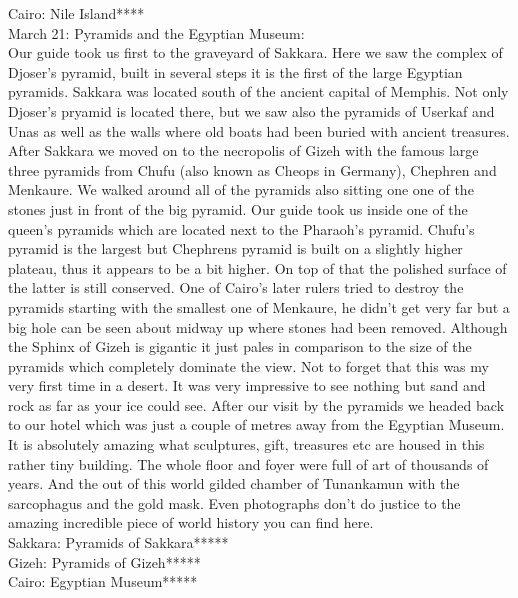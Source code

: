 Cairo: Nile Island****\\

March 21: Pyramids and the Egyptian Museum:\\
Our guide took us first to the graveyard of Sakkara. Here we saw the complex of Djoser's pyramid, built in several steps it is the first of the large Egyptian pyramids. Sakkara was located south of the ancient capital of Memphis. Not only Djoser's pryamid is located there, but we saw also the pyramids of Userkaf and Unas as well as the walls where old boats had been buried with ancient treasures. After Sakkara we moved on to the necropolis of Gizeh with the famous large three pyramids from Chufu (also known as Cheops in Germany), Chephren and Menkaure. We walked around all of the pyramids also sitting one one of the stones just in front of the big pyramid. Our guide took us inside one of the queen's pyramids which are located next to the Pharaoh's pyramid. Chufu's pyramid is the largest but Chephrens pyramid is built on a slightly higher plateau, thus it appears to be a bit higher. On top of that the polished surface of the latter is still conserved. One of Cairo's later rulers tried to destroy the pyramids starting with the smallest one of Menkaure, he didn't get very far but a big hole can be seen about midway up where stones had been removed. Although the Sphinx of Gizeh is gigantic it just pales in comparison to the size of the pyramids which completely dominate the view. Not to forget that this was my very first time in a desert. It was very impressive to see nothing but sand and rock as far as your ice could see. After our visit by the pyramids we headed back to our hotel which was just a couple of metres away from the Egyptian Museum. It is absolutely amazing what sculptures, gift, treasures etc are housed in this rather tiny building. The whole floor and foyer were full of art of thousands of years. And the out of this world gilded chamber of Tunankamun with the sarcophagus and the gold mask. Even photographs don't do justice to the amazing incredible piece of world history you can find here.\\

Sakkara: Pyramids of Sakkara*****\\
Gizeh: Pyramids of Gizeh*****\\
Cairo: Egyptian Museum*****\\

